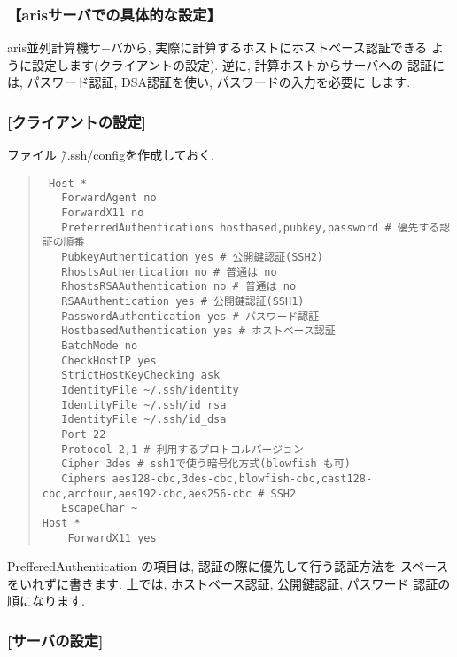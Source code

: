 \documentclass[a4paper,titlepage]{jreport}
\begin{document}
\subsubsection{【arisサーバでの具体的な設定】}

aris並列計算機サ−バから, 実際に計算するホストにホストベース認証できる
ように設定します(クライアントの設定). 逆に, 計算ホストからサーバへの
認証には, パスワード認証, DSA認証を使い, パスワードの入力を必要に
します.

\subsubsection{[クライアントの設定]}

ファイル \~/.ssh/configを作成しておく.

\begin{quote}
\begin{screen}
\begin{verbatim}
 Host *
   ForwardAgent no
   ForwardX11 no
   PreferredAuthentications hostbased,pubkey,password # 優先する認証の順番
   PubkeyAuthentication yes # 公開鍵認証(SSH2)
   RhostsAuthentication no # 普通は no
   RhostsRSAAuthentication no # 普通は no
   RSAAuthentication yes # 公開鍵認証(SSH1)
   PasswordAuthentication yes # パスワード認証
   HostbasedAuthentication yes # ホストベース認証
   BatchMode no
   CheckHostIP yes
   StrictHostKeyChecking ask
   IdentityFile ~/.ssh/identity
   IdentityFile ~/.ssh/id_rsa
   IdentityFile ~/.ssh/id_dsa
   Port 22
   Protocol 2,1 # 利用するプロトコルバージョン
   Cipher 3des # ssh1で使う暗号化方式(blowfish も可)
   Ciphers aes128-cbc,3des-cbc,blowfish-cbc,cast128-cbc,arcfour,aes192-cbc,aes256-cbc # SSH2
   EscapeChar ~
Host *
	ForwardX11 yes
\end{verbatim}
\end{screen}
\end{quote}

PrefferedAuthentication の項目は, 認証の際に優先して行う認証方法を
スペースをいれずに書きます. 上では, ホストベース認証, 公開鍵認証, パスワード
認証の順になります.

\subsubsection{[サーバの設定]}
\end{document}
